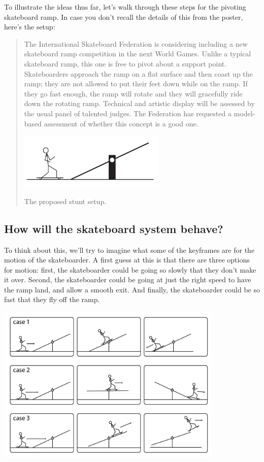 \documentclass{tufte-handout}
\begin{document}
To illustrate the ideas thus far, let's walk through these steps for the pivoting skateboard ramp.  In case you don't recall the details of this from the poster, here's the setup:

\begin{quote}
The International Skateboard Federation is considering including
 a new skateboard ramp competition in the next World
Games. Unlike a typical skateboard ramp, this one is free to pivot
about a support point.  Skateboarders approach the ramp on a flat
surface and then coast up the ramp; they are not allowed to put their
feet down while on the ramp.  If they go fast enough, the ramp will
rotate and they will gracefully ride down the rotating ramp.
Technical and artistic display will be assessed by the usual panel of
talented judges.
The Federation has requested a model-based assessment of whether this concept is a good one.

\begin{marginfigure}
\includegraphics[width=7cm]{figs/skateboard1}
\caption{The proposed stunt setup.}
\end{marginfigure}

\end{quote}

\subsection{How will the skateboard system behave?}

To think about this, we'll try to imagine what some of the keyframes are for the motion of the skateboarder.  A first guess at this is that there are three options for motion:  first, the skateboarder could be going so slowly that they don't make it over.  Second, the skateboarder could be going at just the right speed to have the ramp land, and allow a smooth exit.  And finally, the skateboarder could be so fast that they fly off the ramp.

\includegraphics[height=3in]{figs/improvedskateboardkeyframes}
\end{document}
